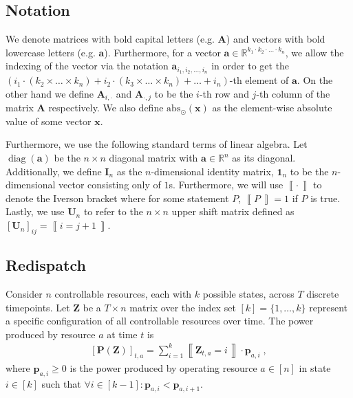 \documentclass[conference]{IEEEtran}
\newcommand{\bp}{\boldsymbol{p}}
\newcommand{\bP}{\boldsymbol{P}}
\newcommand{\bZ}{\boldsymbol{Z}}
\newcommand{\ones}[1]{\boldsymbol{1}_{#1}}
\newcommand{\ups}[1]{\boldsymbol{U}_{#1}}
\newcommand{\indices}[1]{[#1]}
\newcommand{\iverson}[1]{\left\llbracket #1\, \right\rrbracket}
\newcommand{\bx}{\boldsymbol{x}}
\newcommand{\g}[1]{#1}
\renewcommand{\vec}[1]{\bm{#1}}
\newcommand{\mat}[1]{\bm{#1}}
\DeclareMathOperator*{\diag}{diag}
\begin{document}
\subsection{Notation}\label{sec:notation}

We denote matrices with bold capital letters (e.g. $\mat{A}$) and
vectors with bold lowercase letters (e.g. $\vec{a}$). Furthermore, for a
vector $\vec{a}\in\mathbb{R}^{k_{1}\cdot k_{2} \cdot\ldots\cdot k_{n}}$,
we allow the indexing of the vector via the notation
$\vec{a}_{i_{1},i_{2},\ldots,i_{n}}$ in order to get the
$(i_{1}\cdot (k_{2}\times\ldots\times k_{n}) + i_{2}\cdot
(k_{3}\times\ldots\times k_{n}) + \ldots +i_{n})$-th element of
$\vec{a}$. On the other hand we define $\mat{A}_{i,\cdot}$ and
$\mat{A}_{\cdot,j}$ to be the $i$-th row and $j$-th column of the matrix
$\mat{A}$ respectively. We also define $\text{abs}_{\odot}(\bx)$ as the
element-wise absolute value of some vector $\bx$.

Furthermore, we use the following standard terms of linear algebra. Let
$\diag\left(\vec{a}\right)$ be the $n\times n$ diagonal matrix with
$\vec{a}\in\mathbb R^n$ as its diagonal. Additionally, we define
$\mat{I}_n$ as the $n$-dimensional identity matrix, $\ones{n}$ to be the
$n$-dimensional vector consisting only of $1$s. Furthermore, we will use
$\iverson{\cdot}$ to denote the Iverson bracket where for some statement
$P$, $\iverson{P}=1$ if $P$ is true. Lastly, we use $\ups{n}$ to refer
to the $n\times n$ upper shift matrix defined as
$[\ups{n}]_{ij} = \iverson{i=j+1}$.

\subsection{Redispatch} \label{sec:redispatch}

Consider $n$ controllable resources, each with $k$ possible states,
across $T$ discrete timepoints. Let $\bZ$ be a $T\times n$ matrix over
the index set $\indices{k}=\{1,\dots,k\}$ represent a specific
configuration of all controllable resources over time.  The power
produced by resource $a$ at time $t$ is
\begin{gather}
  \label{eq:8}
  [\g{\bP}(\g{\bZ})]_{t,a}=
  \sum_{i=1}^k \iverson{\g{\bZ}_{t,a} = i}\cdot\g{\bp}_{a,i}\;,
\end{gather}
where $\bp_{a,i}\geq 0$ is the power produced by operating resource
$a\in\indices{n}$ in state $i\in\indices{k}$ such that
$\forall i \in \indices{k-1} : \bp_{a,i} < \bp_{a,i+1}$.
\end{document}
